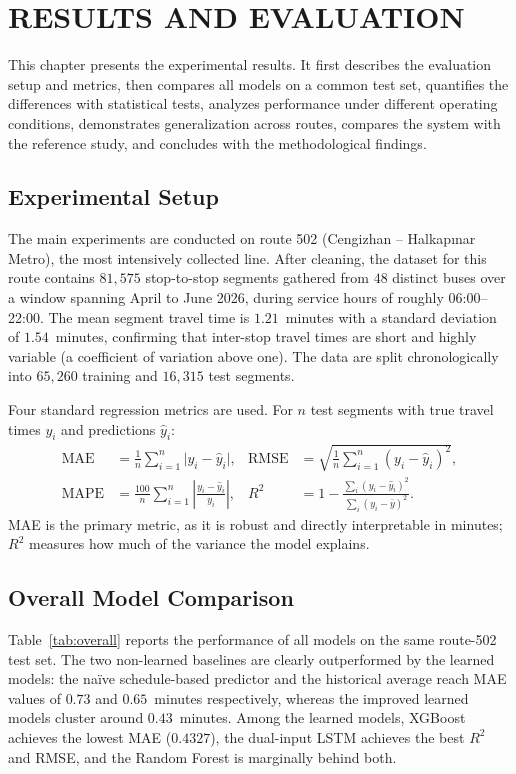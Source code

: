 \chapter{RESULTS AND EVALUATION}

This chapter presents the experimental results. It first describes the evaluation setup and metrics, then compares all models on a common test set, quantifies the differences with statistical tests, analyzes performance under different operating conditions, demonstrates generalization across routes, compares the system with the reference study, and concludes with the methodological findings.

\section{Experimental Setup}

The main experiments are conducted on route 502 (Cengizhan -- Halkapınar Metro), the most intensively collected line. After cleaning, the dataset for this route contains $81{,}575$ stop-to-stop segments gathered from $48$ distinct buses over a window spanning April to June 2026, during service hours of roughly 06:00--22:00. The mean segment travel time is $1.21$~minutes with a standard deviation of $1.54$~minutes, confirming that inter-stop travel times are short and highly variable (a coefficient of variation above one). The data are split chronologically into $65{,}260$ training and $16{,}315$ test segments.

Four standard regression metrics are used. For $n$ test segments with true travel times $y_i$ and predictions $\hat{y}_i$:
\begin{align}
\text{MAE} &= \frac{1}{n}\sum_{i=1}^{n}\lvert y_i - \hat{y}_i\rvert, &
\text{RMSE} &= \sqrt{\frac{1}{n}\sum_{i=1}^{n}(y_i - \hat{y}_i)^2}, \\
\text{MAPE} &= \frac{100}{n}\sum_{i=1}^{n}\left\lvert\frac{y_i - \hat{y}_i}{y_i}\right\rvert, &
R^2 &= 1 - \frac{\sum_i (y_i-\hat{y}_i)^2}{\sum_i (y_i-\bar{y})^2}.
\end{align}
MAE is the primary metric, as it is robust and directly interpretable in minutes; $R^2$ measures how much of the variance the model explains.

\section{Overall Model Comparison}

Table~\ref{tab:overall} reports the performance of all models on the same route-502 test set. The two non-learned baselines are clearly outperformed by the learned models: the naïve schedule-based predictor and the historical average reach MAE values of $0.73$ and $0.65$~minutes respectively, whereas the improved learned models cluster around $0.43$~minutes. Among the learned models, XGBoost achieves the lowest MAE ($0.4327$), the dual-input LSTM achieves the best $R^2$ and RMSE, and the Random Forest is marginally behind both.

